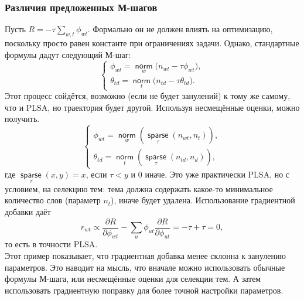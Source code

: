 \documentclass[12pt]{article}
\newcommand{\norm}{\mathop{\mathsf{norm}}\limits}
\newcommand{\sparse}{\mathop{\mathsf{sparse}}\limits}
\begin{document}
 \subsubsection{Различия предложенных М-шагов}
Пусть $R = -\tau \sum\limits_{w, t} \phi_{wt}$. Формально он не должен влиять на оптимизацию, поскольку просто равен константе при ограничениях задачи. Однако, стандартные формулы дадут следующий М-шаг:
\[
\left\{
	\begin{aligned}
		\phi_{wt} = \norm_w \bigl( n_{wt} - \tau \phi_{wt}\bigr),\\
		\theta_{td} = \norm_t \bigl( n_{td} - \tau \theta_{td}\bigr).
	\end{aligned}
\right.
\]
Этот процесс сойдётся, возможно (если не будет занулений) к тому же самому, что и PLSA, но траектория будет другой. Используя несмещённые оценки, можно получить.
\[
\left\{
	\begin{aligned}
		\phi_{wt} = \norm_w (\sparse_{\tau}(n_{wt}, n_{t})),\\
		\theta_{td} = \norm_t (\sparse_{\tau}(n_{td}, n_{d})),
	\end{aligned}
\right.
\]
где $\sparse_{\tau}(x, y) = x$, если $\tau < y$ и $0$ иначе. Это уже практически PLSA, но с условием, на селекцию тем: тема должна содержать какое-то минимальное количество слов (параметр $n_t$), иначе будет удалена.
Использование градиентной добавки даёт 
\[
r_{wt} \propto \frac{\partial{R}}{\partial{\phi_{wt}}} - \sum\limits_u \phi_{ut} \frac{\partial{R}}{\partial{\phi_{ut}}} = -\tau + \tau =0,
\]
то есть в точности PLSA.\\

Этот пример показывает, что градиентная добавка менее склонна к занулению параметров. Это наводит на мысль, что вначале можно использовать обычные формулы М-шага, или несмещённые оценки для селекции тем. А затем использовать градиентную поправку для более точной настройки параметров.\\
\end{document}
